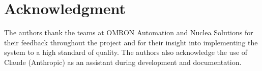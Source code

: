 \documentclass[conference]{IEEEtran}
\begin{document}
\section*{Acknowledgment}
The authors thank the teams at OMRON Automation and Nuclea Solutions for their
feedback throughout the project and for their insight into implementing the system
to a high standard of quality. The authors also acknowledge the use of Claude
(Anthropic) as an assistant during development and documentation.

\end{document}
